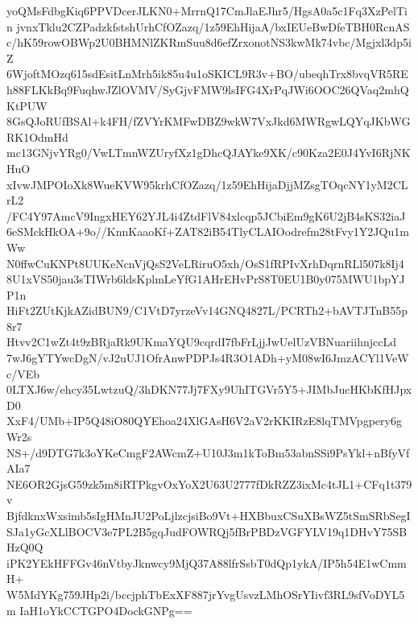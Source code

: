 yoQMsFdbgKiq6PPVDcerJLKN0+MrrnQ17CmJlaEJhr5/HgsA0a5c1Fq3XzPelTin
jvnxTklu2CZPadzkfstshUrhCfOZazq/1z59EhHijaA/bxIEUeBwDfeTBH0RcnAS
c/hK59rowOBWp2U0BHMNlZKRmSuu8d6efZrxonotNS3kwMk74vbc/Mgjxl3dp5iZ
6WjoftMOzq615sdEsitLnMrh5ik85u4u1oSKICL9R3v+BO/ubeqhTrx8bvqVR5RE
h88FLKkBq9FuqhwJZlOVMV/SyGjvFMW9lsIFG4XrPqJWi6OOC26QVaq2mhQKtPUW
8GsQJoRUfBSAl+k4FH/fZVYrKMFwDBZ9wkW7VxJkd6MWRgwLQYqJKbWGRK1OdmHd
mc13GNjvYRg0/VwLTmnWZUryfXz1gDhcQJAYke9XK/c90Kza2E0J4YvI6RjNKHuO
xIvwJMPOIoXk8WueKVW95krhCfOZazq/1z59EhHijaDjjMZsgTOqcNY1yM2CLrL2
/FC4Y97AmcV9IngxHEY62YJL4i4ZtdFlV84xlcqp5JCbiEm9gK6U2jB4sKS32iaJ
6eSMckHkOA+9o//KnnKaaoKf+ZAT82iB54TlyCLAIOodrefm28tFvy1Y2JQu1mWw
N0ffwCuKNPt8UUKeNcnVjQsS2VeLRiruO5xh/OsS1fRPIvXrhDqrnRLl507k8Ij4
8U1xVS50jau3sTIWrb6ldsKplmLeYfG1AHrEHvPrS8T0EU1B0y075MWU1bpYJP1n
HiFt2ZUtKjkAZidBUN9/C1VtD7yrzeVv14GNQ4827L/PCRTh2+bAVTJTnB55p8r7
Htvv2C1wZt4t9zBRjaRk9UKmaYQU9cqrdI7fbFrLjjJwUelUzVBNuariihnjccLd
7wJ6gYTYwcDgN/vJ2uUJ1OfrAnwPDPJs4R3O1ADh+yM08wI6JmzACYl1VeWc/VEb
0LTXJ6w/ehcy35LwtzuQ/3hDKN77Jj7FXy9UhITGVr5Y5+JIMbJucHKbKfHJpxD0
XxF4/UMb+IP5Q48iO80QYEhoa24XlGAsH6V2aV2rKKIRzE8lqTMVpgpery6gWr2s
NS+/d9DTG7k3oYKeCmgF2AWcmZ+U10J3m1kToBm53abnSSi9PsYkl+nBfyVfAIa7
NE6OR2GjsG59zk5m8iRTPkgvOxYoX2U63U2777fDkRZZ3ixMc4tJL1+CFq1t379v
BjfdknxWxsimb5sIgHMnJU2PoLjlzcjsiBo9Vt+HXBbuxCSuXBsWZ5tSmSRbSegI
SJa1yGcXLlBOCV3e7PL2B5gqJudFOWRQj5fBrPBDzVGFYLV19q1DHvY75SBHzQ0Q
iPK2YEkHFFGv46nVtbyJknwcy9MjQ37A88lfrSsbT0dQp1ykA/IP5h54E1wCmmH+
W5MdYKg759JHp2i/bccjphTbExXF887jrYvgUsvzLMhOSrYIivf3RL9sfVoDYL5m
IaH1oYkCCTGPO4DockGNPg==
